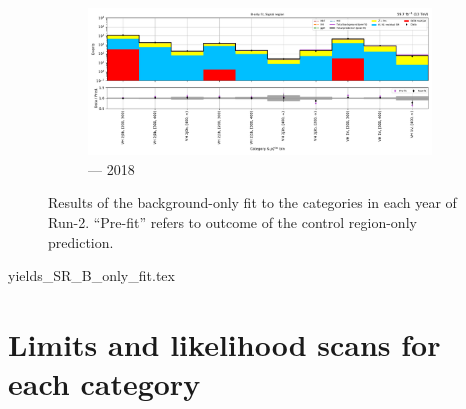 \begin{figure}[htbp]
    \begin{subfigure}[b]{0.79\textwidth}
        \includegraphics[width=\textwidth]{chapters/higgstoinv/figures/mountain_ranges/2018/VH/SR_tree_fit_b-abs_values_VH_cats.pdf}
        \caption{\VH --- 2018}
    \end{subfigure}
    \caption[Results of the background-only fit to the \VH categories in each year of Run-2]{Results of the background-only fit to the \VH categories in each year of Run-2. ``Pre-fit'' refers to outcome of the control region-only prediction.}
    \label{fig:htoinv_mountain_range_B_only_VH_SR}
\end{figure}

\clearpage




{yields_SR_B_only_fit.tex}
\clearpage




\section{Limits and likelihood scans for each category}
\label{sec:limits_likelihoods_cats_supplementary}

